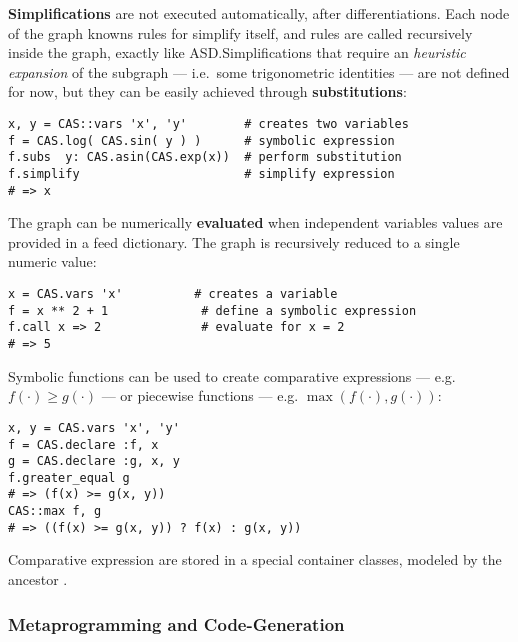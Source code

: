 \textbf{Simplifications} are not executed automatically, after differentiations. Each node of the graph knowns rules for simplify itself, and rules are called recursively inside the graph, exactly like ASD.\@ Simplifications that require an \emph{heuristic expansion} of the subgraph --- i.e.\ some trigonometric identities --- are not defined for now, but they can be easily achieved through \textbf{substitutions}:

\begin{lstlisting}[caption={Simplification example},label={code:example-simp}]
x, y = CAS::vars 'x', 'y'        # creates two variables
f = CAS.log( CAS.sin( y ) )      # symbolic expression
f.subs  y: CAS.asin(CAS.exp(x))  # perform substitution
f.simplify                       # simplify expression
# => x
\end{lstlisting}

The graph can be numerically \textbf{evaluated} when independent variables values are provided in a feed dictionary. The graph is recursively reduced to a single numeric value:
\begin{lstlisting}[caption={Graph evaluation example},label={code:example-call}]
x = CAS.vars 'x'          # creates a variable
f = x ** 2 + 1             # define a symbolic expression
f.call x => 2              # evaluate for x = 2
# => 5
\end{lstlisting}

Symbolic functions can be used to create comparative expressions --- e.g. $f(\cdot) \geq g(\cdot)$ --- or piecewise functions --- e.g. $\max(f(\cdot), g(\cdot))$:
\begin{lstlisting}[caption={Expressions and Piecewise functions},label={code:example-expr}]
x, y = CAS.vars 'x', 'y'
f = CAS.declare :f, x
g = CAS.declare :g, x, y
f.greater_equal g
# => (f(x) >= g(x, y))
CAS::max f, g
# => ((f(x) >= g(x, y)) ? f(x) : g(x, y))
\end{lstlisting}
Comparative expression are stored in a special container classes, modeled by the ancestor \CASExpression.

\subsubsection{Metaprogramming and Code-Generation}

